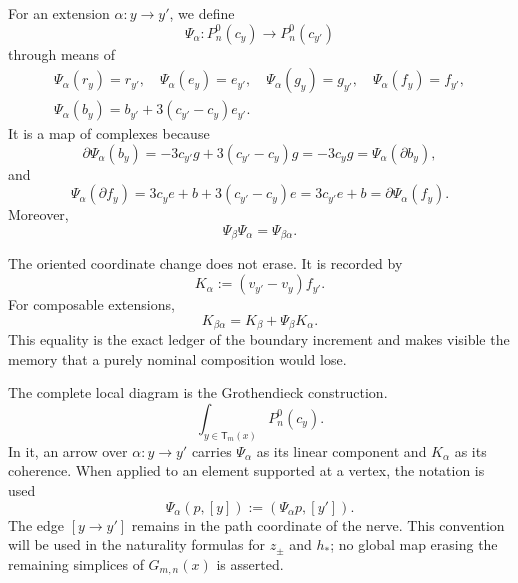For an extension \(\alpha:y\to y'\), we define
\begin{equation}\label{eq:detint-psi}
 \Psi_\alpha:P_n^0(c_y)\longrightarrow P_n^0(c_{y'})
\end{equation}
through means of
\begin{equation}\label{eq:detint-psi-generadores}
\begin{gathered}
 \Psi_\alpha(r_y)=r_{y'},\quad
 \Psi_\alpha(e_y)=e_{y'},\quad
 \Psi_\alpha(g_y)=g_{y'},\quad
 \Psi_\alpha(f_y)=f_{y'},\\
 \Psi_\alpha(b_y)=b_{y'}+3(c_{y'}-c_y)e_{y'}.
\end{gathered}
\end{equation}
It is a map of complexes because
\begin{equation}\label{eq:detint-psi-b-chain}
 \partial\Psi_\alpha(b_y)
 =-3c_{y'}g+3(c_{y'}-c_y)g
 =-3c_yg
 =\Psi_\alpha(\partial b_y),
\end{equation}
and
\begin{equation}\label{eq:detint-psi-f-chain}
 \Psi_\alpha(\partial f_y)
 =3c_ye+b+3(c_{y'}-c_y)e
 =3c_{y'}e+b
 =\partial\Psi_\alpha(f_y).
\end{equation}
Moreover,
\begin{equation}\label{eq:detint-psi-functorial}
 \Psi_\beta\Psi_\alpha=\Psi_{\beta\alpha}.
\end{equation}

The oriented coordinate change does not erase. It is recorded by
\begin{equation}\label{eq:detint-k-alpha}
 K_\alpha:=(v_{y'}-v_y)f_{y'}.
\end{equation}
For composable extensions,
\begin{equation}\label{eq:detint-k-coherencia}
 K_{\beta\alpha}=K_\beta+\Psi_\beta K_\alpha.
\end{equation}
This equality is the exact ledger of the boundary increment and makes visible
the memory that a purely nominal composition would lose.

The complete local diagram is the Grothendieck construction.
\begin{equation}\label{eq:detint-grothendieck-local}
 \int_{y\in\mathsf T_m(x)}P_n^0(c_y).
\end{equation}
In it, an arrow over \(\alpha:y\to y'\) carries \(\Psi_\alpha\)
as its linear component and \(K_\alpha\) as its coherence. When applied to an
element supported at a vertex, the notation is used
\begin{equation}\label{eq:detint-psi-soporte-vertice}
 \Psi_\alpha(p,[y]):=(\Psi_\alpha p,[y']).
\end{equation}
The edge \([y\to y']\) remains in the path coordinate of the nerve. This
convention will be used in the naturality formulas for
\(z_\pm\) and \(h_*\); no global map erasing the remaining
simplices of \(G_{m,n}(x)\) is asserted.

